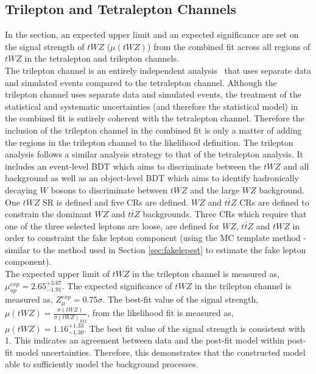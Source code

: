 \subsection{Trilepton and Tetralepton Channels}
\label{sec:combined-results}
In the section, an expected upper limit and an expected significance are set on the signal strength of $tWZ$ ($\mu (tWZ)$) from the combined fit across all regions of $tWZ$ in the tetralepton and trilepton channels.\\

The trilepton channel is an entirely independent analysis~\cite{ben-thesis} that uses separate data and simulated events compared to the tetralepton channel. Although the trilepton channel uses separate data and simulated events, the treatment of the statistical and systematic uncertainties (and therefore the statistical model) in the combined fit is entirely coherent with the tetralepton channel. Therefore the inclusion of the trilepton channel in the combined fit is only a matter of adding the regions in the trilepton channel to the likelihood definition. The trilepton analysis follows a similar analysis strategy to that of the tetralepton analysis. It includes an event-level BDT which aims to discriminate between the $tWZ$ and all background as well as an object-level BDT which aims to identify hadronically decaying $W$ bosons to discriminate between $tWZ$ and the large $WZ$ background. One $tWZ$ SR is defined and five CRs are defined. $WZ$ and $t\bar{t}Z$ CRs are defined to constrain the dominant $WZ$ and $t\bar{t}Z$ backgrounds. Three CRs which require that one of the three selected leptons are loose, are defined for $WZ$, $t\bar{t}Z$ and $tWZ$ in order to constraint the fake lepton component (using the MC template method - similar to the method used in Section \ref{sec:fakelepest} to estimate the fake lepton component).\\

The expected upper limit of $tWZ$ in the trilepton channel is measured as, $\mu_{up}^{exp} =   2.65^{+3.67}_{-1.91}$. The expected significance of $tWZ$ in the trilepton channel is measured as, $Z_{\mu}^{exp} =   0.75\sigma$. The best-fit value of the signal strength, $\mu (tWZ)= \frac{\sigma(tWZ)}{\sigma(tWZ)_{SM}}$, from the likelihood fit is measured as, $\mu (tWZ) =   1.16^{+1.33}_{-1.30}$. The best fit value of the signal strength is consistent with 1. This indicates an agreement between data and the post-fit model within post-fit model uncertainties. Therefore, this demonstrates that the constructed model able to sufficiently model the background processes.\\

